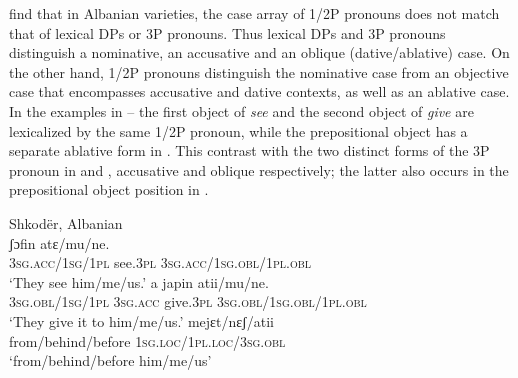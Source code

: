 \documentclass[output=paper,colorlinks,citecolor=brown,nonflat]{./langscibook}
\begin{document}
\citet{ManziniSavoia2014} find that in Albanian varieties, the case array of 1/2P pronouns does not match that of lexical DPs or 3P pronouns. Thus lexical DPs and 3P pronouns distinguish a nominative, an accusative and an oblique (dative/ablative) case. On the other hand, 1/2P pronouns distinguish the nominative case from an objective case that encompasses accusative and dative contexts, as well as an ablative case. In the examples in -- the first object of \textit{see} and the second object of \textit{give} are lexicalized by the same 1/2P pronoun, while the prepositional object has a separate ablative form in . This contrast with the two distinct forms of the 3P pronoun in  and , accusative and oblique respectively; the latter also occurs in the prepositional object position in .  

\ea%
    \label{ex:manzini:10}
    Shkodër, Albanian \citep{ManziniSavoia2014}\\
    \ea\label{ex:manzini:10a} 
          {ʃɔfin}    {atɛ/mu/ne}.\\
        \textsc{3sg.acc/1sg/1pl}    see.\textsc{3pl} \textsc{3sg.acc/1sg.obl/1pl.obl}\\
    \glt ‘They see him/me/us.’
    \ex\label{ex:manzini:10b} 
           {a}   {japin}    {atii/mu/ne}.\\
        \textsc{3sg.obl/1sg/1pl} \textsc{3sg.acc} give.\textsc{3pl}  \textsc{3sg.obl/1sg.obl/1pl.obl}\\
    \glt ‘They give it to him/me/us.’
    \ex\label{ex:manzini:10c} 
         {mejɛt/nɛʃ/atii}\\
        from/behind/before \textsc{1sg.loc/1pl.loc/3sg.obl}\\
    \glt ‘from/behind/before him/me/us’
    \z
\z
\end{document}
